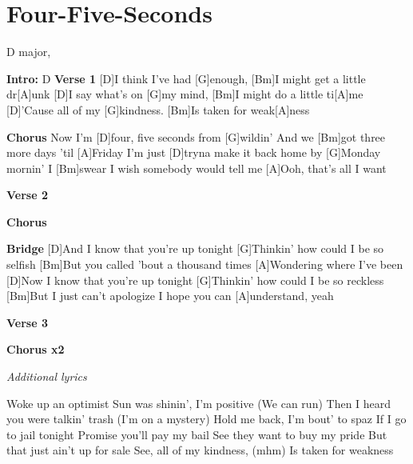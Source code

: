 \documentclass[../../songbookMain]{subfiles}
\begin{document}
\section{Four-Five-Seconds}
{\tiny
D major,
}

\begin{guitar}
\begin{multicols}{2}


\textbf{Intro:} D
\textbf{Verse 1}
[D]I think I've had [G]enough, 
[Bm]I might get a little dr[A]unk
[D]I say what's on [G]my mind,
[Bm]I might do a little ti[A]me
[D]'Cause all of my [G]kindness. 
[Bm]Is taken for weak[A]ness

\textbf{Chorus}
Now I'm [D]four, five seconds from [G]wildin'
And we [Bm]got three more days 'til [A]Friday
I'm just [D]tryna make it back home by [G]Monday mornin'
I [Bm]swear I wish somebody would tell me
[A]Ooh, that's all I want

\textbf{Verse 2}

\textbf{Chorus}

\textbf{Bridge}
[D]And I know that you're up tonight
[G]Thinkin' how could I be so selfish
[Bm]But you called 'bout a thousand times
[A]Wondering where I've been
[D]Now I know that you're up tonight
[G]Thinkin' how could I be so reckless
[Bm]But I just can't apologize
I hope you can [A]understand, yeah

\textbf{Verse 3}

\textbf{Chorus x2}


\end{multicols}

\begin{center}
\textit{Additional lyrics}
\end{center}

\begin{multicols}{2}\begin{flushleft}
Woke up an optimist
Sun was shinin', I'm positive (We can run)
Then I heard you were talkin' trash (I'm on a mystery)
Hold me back, I'm bout' to spaz
\columnbreak
If I go to jail tonight
Promise you'll pay my bail
See they want to buy my pride
But that just ain't up for sale
See, all of my kindness, (mhm)
Is taken for weakness

\end{flushleft}
\end{multicols}
\end{guitar}
\end{document}
